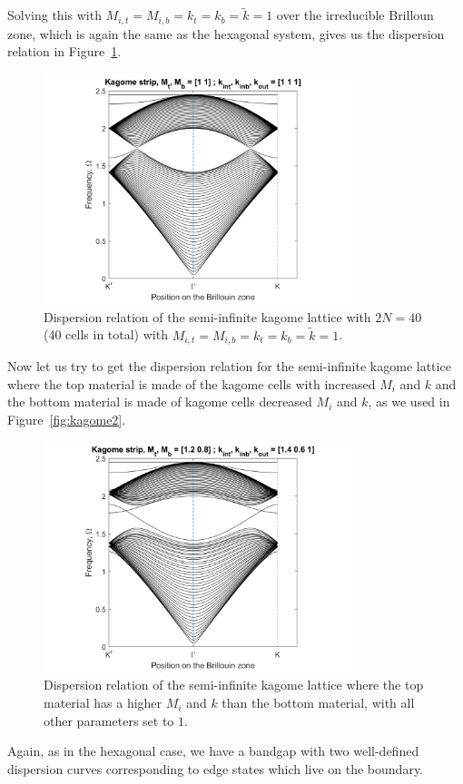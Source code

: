 Solving this with $M_{i,t}=M_{i,b}=k_t=k_b=\tilde{k}=1$ over the irreducible
Brilloun zone, which is again the same as the hexagonal system, gives us the
dispersion relation in Figure~\ref{fig:kagomestripdisper}.

\begin{figure}[!h]
\centering
\includegraphics[width=0.8\textwidth]{imgs/kagomestrip.png}
\caption{\label{fig:kagomestripdisper} Dispersion relation of the semi-infinite
  kagome lattice with $2N=40$ (40 cells in total) with
  $M_{i,t}=M_{i,b}=k_t=k_b=\tilde{k}=1$.}
\end{figure}

Now let us try to get the dispersion relation for the semi-infinite kagome
lattice where the top material is made of the kagome cells with increased $M_i$
and $k$ and the bottom material is made of kagome cells decreased $M_i$ and
$k$, as we used in Figure~\ref{fig:kagome2}.

\begin{figure}[!h]
\centering
\includegraphics[width=0.8\textwidth]{imgs/kagomestripperturbed.png}
\caption{\label{fig:kagomeperturbed} Dispersion relation of the semi-infinite
  kagome lattice where the top material has a higher $M_i$ and $k$ than the
  bottom material, with all other parameters set to $1$.}
\end{figure}

Again, as in the hexagonal case, we have a bandgap with two well-defined
dispersion curves corresponding to edge states which live on the boundary.
